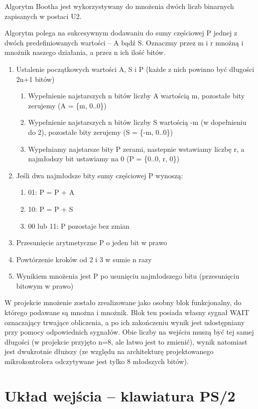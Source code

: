 \documentclass[a4paper,12pt]{report}
\begin{document}
Algorytm Bootha jest wykorzystywany do mnożenia dwóch liczb binarnych zapisanych w postaci U2.

Algorytm polega na sukcesywnym dodawaniu do sumy częściowej P jednej z dwóch predefiniowanych wartości -- A bądź S. Oznaczmy przez m i r mnożną i mnożnik naszego działania, a przez n ich ilość bitów.

\begin{enumerate}
  \item Ustalenie początkowych wartości A, S i P (każde z nich powinno być długości 2n+1 bitów)
  \begin{enumerate}
    \item Wypełnienie najstarszych n bitów liczby A wartością m, pozostałe bity zerujemy (A = \{m, 0..0\})
    \item Wypełnienie najstarszych n bitów liczby S wartością -m (w dopełnieniu do 2), pozostałe bity zerujemy (S = \{-m, 0..0\})
    \item Wypełniamy najstarsze bity P zerami, nastepnie wstawiamy liczbę r, a najmłodszy bit ustawiamy na 0 (P = \{0..0, r, 0\})
  \end{enumerate}
  \item Jeśli dwa najmłodsze bity sumy częściowej P wynoszą:
  \begin{enumerate}
    \item 01: P = P + A
    \item 10: P = P + S
    \item 00 lub 11: P pozostaje bez zmian
  \end{enumerate}
  \item Przesunięcie arytmetyczne P o jeden bit w prawo
  \item Powtórzenie kroków od 2 i 3 w sumie n razy
  \item Wynikiem mnożenia jest P po usunięciu najmłodszego bitu (przesunięciu bitowym w prawo)
\end{enumerate}

W projekcie mnożenie zostało zrealizowane jako osobny blok funkcjonalny, do którego podawane są mnożna i mnożnik. Blok ten posiada własny sygnał WAIT oznaczający trwające obliczenia, a po ich zakończeniu wynik jest udostępniany przy pomocy odpowiednich sygnałów. Obie liczby na wejściu muszą być tej samej długości (w projekcie przyjęto n=8, ale łatwo jest to zmienić), wynik natomiast jest dwukrotnie dłuższy (ze względu na architekturę projektowanego mikrokontrolera odczytywane jest tylko 8 młodszych bitów).

\section{Układ wejścia -- klawiatura PS/2}
\end{document}
